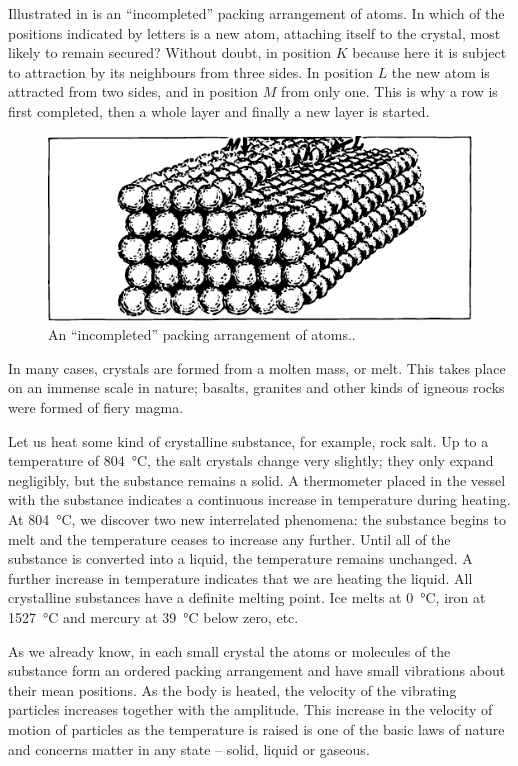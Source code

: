Illustrated in  is an ``incompleted'' packing arrangement of atoms. In which of the positions indicated by letters is a new atom, attaching itself to the crystal, most likely to remain secured? Without doubt, in posi­tion $K$ because here it is subject to attraction by its neigh­bours from three sides. In position $L$ the new atom is attracted from two sides, and in position $M$ from only one. This is why a row is first completed, then a whole layer and finally a new layer is started.
\begin{figure}[!ht]
\centering
\includegraphics[width=\textwidth]{figures/fig-04-08.pdf}
\caption{An ``incompleted'' packing arrangement of atoms..}
\label{fig-4.8}
\end{figure}
In many cases, crystals are formed from a molten mass, or melt. This takes place on an immense scale in nature; basalts, granites and other kinds of igneous rocks were formed of fiery magma.

Let us heat some kind of crystalline substance, for example, rock salt. Up to a temperature of \SI{804}{\celsius}, the salt crystals change very slightly; they only expand negligibly, but the substance remains a solid. A thermom­eter placed in the vessel with the substance indicates a continuous increase in temperature during heating. At \SI{804}{\celsius}, we discover two new interrelated phenomena: the substance begins to melt and the temperature ceases to increase any further. Until all of the substance is con­verted into a liquid, the temperature remains unchanged. A further increase in temperature indicates that we are heating the liquid. All crystalline substances have a def­inite melting point. Ice melts at \SI{0}{\celsius}, iron at \SI{1527}{\celsius} and mercury at \SI{39}{\celsius} below zero, etc.

As we already know, in each small crystal the atoms or molecules of the substance form an ordered packing arrange­ment and have small vibrations about their mean posi­tions. As the body is heated, the velocity of the vibrating particles increases together with the amplitude. This increase in the velocity of motion of particles as the tem­perature is raised is one of the basic laws of nature and concerns matter in any state -- solid, liquid or gaseous.

